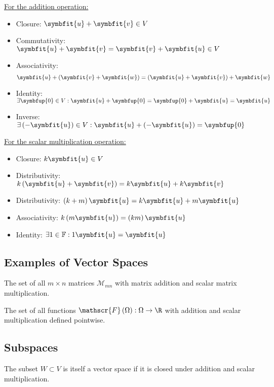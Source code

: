 \documentclass{article}
\begin{document}
\begin{multicols*}{3}
    \underline{For the addition operation:}
    \begin{itemize}
        \item Closure: \(\symbfit{u} + \symbfit{v} \in V\)
        \item Commutativity: \(\symbfit{u} + \symbfit{v} = \symbfit{v} + \symbfit{u} \in V\)
        \item Associativity: \begin{equation*}\symbfit{u} + \left( \symbfit{v} + \symbfit{w} \right) = \left( \symbfit{u} + \symbfit{v} \right) + \symbfit{w}\end{equation*}
        \item Identity: \(\exists \symbfup{0} \in V : \symbfit{u} + \symbfup{0} = \symbfup{0} + \symbfit{u} = \symbfit{u}\)
        \item Inverse: \(\exists \left( -\symbfit{u} \right) \in V : \symbfit{u} + \left( -\symbfit{u} \right) = \symbfup{0}\)
    \end{itemize}
    \underline{For the scalar multiplication operation:}
    \begin{itemize}
        \item Closure: \(k \symbfit{u} \in V\)
        \item Distributivity: \(k \left( \symbfit{u} + \symbfit{v} \right) = k\symbfit{u} + k\symbfit{v}\)
        \item Distributivity: \(\left( k + m \right) \symbfit{u} = k\symbfit{u} + m\symbfit{u}\)
        \item Associativity: \(k \left( m\symbfit{u} \right) = \left( k m \right) \symbfit{u}\)
        \item Identity: \(\exists 1 \in \mathbb{F} : 1 \symbfit{u} = \symbfit{u}\)
    \end{itemize}

    \subsection{Examples of Vector Spaces}
    The set of all \(m \times n\) matrices \(\mathscr{M}_{mn}\) with matrix addition and scalar matrix multiplication.

    The set of all functions \(\mathscr{F}\left( \Omega \right) : \Omega \to \R\) with addition and scalar multiplication defined pointwise.
    \subsection{Subspaces}
    The subset \(W \subset V\) is itself a vector space if it is closed under addition and scalar multiplication.

\end{multicols*}
\end{document}
